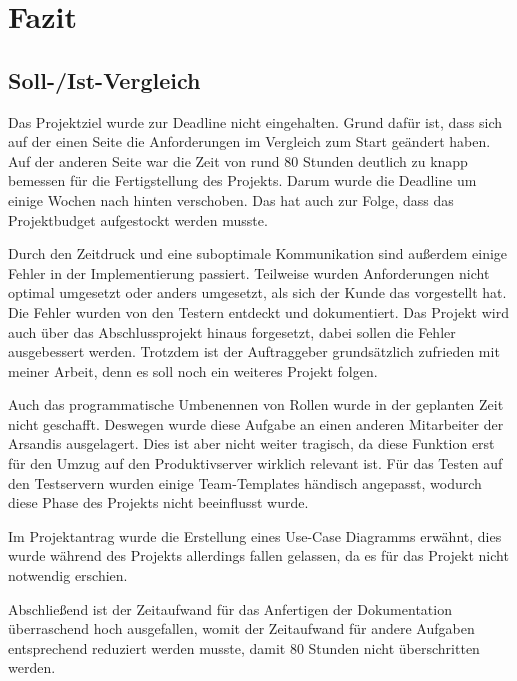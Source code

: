 \section{Fazit} 
\label{sec:Fazit}

\subsection{Soll-/Ist-Vergleich}
\label{sec:SollIstVergleich}


Das Projektziel wurde zur Deadline nicht eingehalten.
Grund dafür ist, dass sich auf der einen Seite die Anforderungen im Vergleich zum Start geändert haben.
Auf der anderen Seite war die Zeit von rund 80 Stunden deutlich zu knapp bemessen für die Fertigstellung des Projekts.
Darum wurde die Deadline um einige Wochen nach hinten verschoben.
Das hat auch zur Folge, dass das Projektbudget aufgestockt werden musste.

Durch den Zeitdruck und eine suboptimale Kommunikation sind außerdem einige Fehler in der Implementierung passiert.
Teilweise wurden Anforderungen nicht optimal umgesetzt oder anders umgesetzt, als sich der Kunde das vorgestellt hat.
Die Fehler wurden von den Testern entdeckt und dokumentiert.
Das Projekt wird auch über das Abschlussprojekt hinaus forgesetzt, dabei sollen die Fehler ausgebessert werden.
Trotzdem ist der Auftraggeber grundsätzlich zufrieden mit meiner Arbeit, denn es soll noch ein weiteres Projekt folgen.

Auch das programmatische Umbenennen von Rollen wurde in der geplanten Zeit nicht geschafft.
Deswegen wurde diese Aufgabe an einen anderen Mitarbeiter der Arsandis ausgelagert.
Dies ist aber nicht weiter tragisch, da diese Funktion erst für den Umzug auf den Produktivserver wirklich relevant ist.
Für das Testen auf den Testservern wurden einige Team-Templates händisch angepasst, wodurch diese Phase des Projekts nicht beeinflusst wurde.

Im Projektantrag wurde die Erstellung eines Use-Case Diagramms erwähnt, dies wurde während des Projekts allerdings fallen gelassen, da es für das Projekt nicht notwendig erschien.

Abschließend ist der Zeitaufwand für das Anfertigen der Dokumentation überraschend hoch ausgefallen, womit der Zeitaufwand für andere Aufgaben entsprechend reduziert werden musste, damit 80 Stunden nicht überschritten werden.

